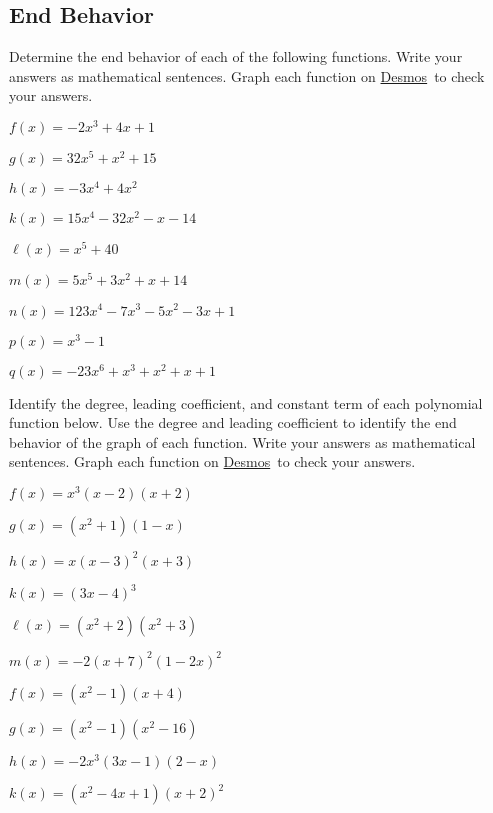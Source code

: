 \documentclass[12pt]{book}
\theoremstyle{definition}
\newcommand{\Desmos}{\href{https://www.desmos.com/}{Desmos}}
\begin{document}
\subsection*{End Behavior}
Determine the end behavior of each of the following functions.  Write your answers as mathematical sentences.  Graph each function on \Desmos \ to check your answers.
\begin{enumerate}
\begin{multicols}{2}
\item $f(x)=-2x^3 + 4x+1$
\item $g(x)=32x^5+x^2+15$
\item $h(x)=-3x^4+4x^2$
\item $k(x)=15x^4-32x^2-x-14$
\item $\ell(x)=x^5+40$
\item $m(x)=5x^5+3x^2+x+14$
\item $n(x)=123x^4-7x^3-5x^2-3x+1$
\item $p(x)=x^3-1$
\item $q(x)=-23x^6+x^3+x^2+x+1$
\end{multicols}
\end{enumerate}
Identify the degree, leading coefficient, and constant term of each polynomial function below.  Use the degree and leading coefficient to identify the end behavior of the graph of each function.  Write your answers as mathematical sentences.  Graph each function on \Desmos \ to check your answers.
\begin{enumerate}[resume]
\begin{multicols}{2}
    \item $f(x)=x^3(x-2)(x+2)$
	\item $g(x)=(x^2+1)(1-x)$
	\item $h(x)=x(x-3)^2(x+3)$
	\item $k(x)=(3x-4)^3$
    \item $\ell(x)=(x^2+2)(x^2+3)$
    \item $m(x)=-2(x+7)^2(1-2x)^2$
    \item $f(x)=(x^2-1)(x+4)$
	\item $g(x)=(x^2-1)(x^2-16)$
	\item $h(x)=-2x^3(3x-1)(2-x)$
	\item $k(x)=(x^2-4x+1)(x+2)^2$
\end{multicols}
\end{enumerate}
\end{document}
